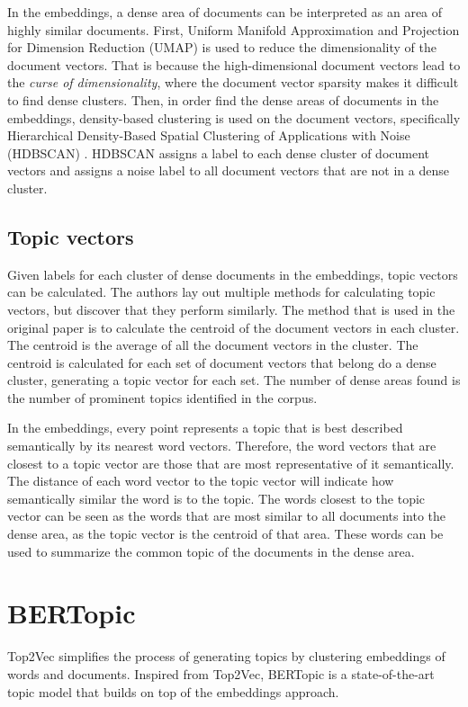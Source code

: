 In the embeddings, a dense area of documents can be interpreted as an area of highly similar documents. First, Uniform Manifold Approximation and Projection for Dimension Reduction (UMAP) \cite{mcinnes_umap_2020} is used to reduce the dimensionality of the document vectors. That is because the high-dimensional document vectors lead to the \textit{curse of dimensionality}, where the document vector sparsity makes it difficult to find dense clusters. Then, in order find the dense areas of documents in the embeddings, density-based clustering is used on the document vectors, specifically Hierarchical Density-Based Spatial Clustering of Applications with Noise (HDBSCAN) \cite{campello_density-based_2013, mcinnes_accelerated_2017, mcinnes_hdbscan_2017}. HDBSCAN assigns a label to each dense cluster of document vectors and assigns a noise label to all document vectors that are not in a dense cluster.


\subsection{Topic vectors}

Given labels for each cluster of dense documents in the embeddings, topic vectors can be calculated. The authors lay out multiple methods for calculating topic vectors, but discover that they perform similarly. The method that is used in the original paper is to calculate the centroid of the document vectors in each cluster. The centroid is the average of all the document vectors in the cluster. The centroid is calculated for each set of document vectors that belong do a dense cluster, generating a topic vector for each set. The number of dense areas found is the number of prominent topics identified in the corpus.

In the embeddings, every point represents a topic that is best described semantically by its nearest word vectors. Therefore, the word vectors that are closest to a topic vector are those that are most representative of it semantically. The distance of each word vector to the topic vector will indicate how semantically similar the word is to the topic. The words closest to the topic vector can be seen as the words that are most similar to all documents into the dense area, as the topic vector is the centroid of that area. These words can be used to summarize the common topic of the documents in the dense area.

\section{BERTopic}
Top2Vec simplifies the process of generating topics by clustering embeddings of words and documents. Inspired from Top2Vec, BERTopic \cite{grootendorst_bertopic_2022} is a state-of-the-art topic model that builds on top of the embeddings approach.

